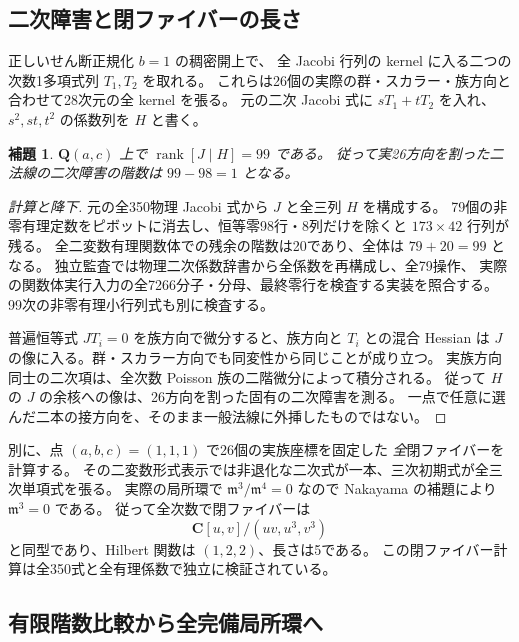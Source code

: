 \documentclass[11pt,a4paper]{ltjsarticle}
\newcommand{\CC}{\mathbf C}
\newcommand{\QQ}{\mathbf Q}
\DeclareMathOperator{\rank}{rank}
\newtheorem{lemma}[theorem]{補題}
\theoremstyle{remark}
\begin{document}
\subsection{二次障害と閉ファイバーの長さ}

正しいせん断正規化 $b=1$ の稠密開上で、
全 Jacobi 行列の kernel に入る二つの次数1多項式列 $T_1,T_2$ を取れる。
これらは26個の実際の群・スカラー・族方向と合わせて28次元の全 kernel を張る。
元の二次 Jacobi 式に $sT_1+tT_2$ を入れ、$s^2,st,t^2$ の係数列を
$H$ と書く。

\begin{lemma}\label{lem:augmented}
$\QQ(a,c)$ 上で $\rank[J\mid H]=99$ である。
従って実26方向を割った二法線の二次障害の階数は $99-98=1$ となる。
\end{lemma}
\begin{proof}[計算と降下]
元の全350物理 Jacobi 式から $J$ と全三列 $H$ を構成する。
79個の非零有理定数をピボットに消去し、恒等零98行・8列だけを除くと
$173\times42$ 行列が残る。
全二変数有理関数体での残余の階数は20であり、全体は $79+20=99$ となる。
独立監査では物理二次係数辞書から全係数を再構成し、全79操作、
実際の関数体実行入力の全7266分子・分母、最終零行を検査する実装を照合する。
99次の非零有理小行列式も別に検査する。

普遍恒等式 $JT_i=0$ を族方向で微分すると、族方向と $T_i$ との混合 Hessian は
$J$ の像に入る。群・スカラー方向でも同変性から同じことが成り立つ。
実族方向同士の二次項は、全次数 Poisson 族の二階微分によって積分される。
従って $H$ の $J$ の余核への像は、26方向を割った固有の二次障害を測る。
一点で任意に選んだ二本の接方向を、そのまま一般法線に外挿したものではない。
\end{proof}

別に、点 $(a,b,c)=(1,1,1)$ で26個の実族座標を固定した
\emph{全}閉ファイバーを計算する。
その二変数形式表示では非退化な二次式が一本、三次初期式が全三次単項式を張る。
実際の局所環で $\mathfrak m^3/\mathfrak m^4=0$ なので Nakayama の補題により
$\mathfrak m^3=0$ である。
従って全次数で閉ファイバーは
\begin{equation}\label{eq:closed-five}
 \CC[u,v]/(uv,u^3,v^3)
\end{equation}
と同型であり、Hilbert 関数は $(1,2,2)$、長さは5である。
この閉ファイバー計算は全350式と全有理係数で独立に検証されている。

\subsection{有限階数比較から全完備局所環へ}
\end{document}

